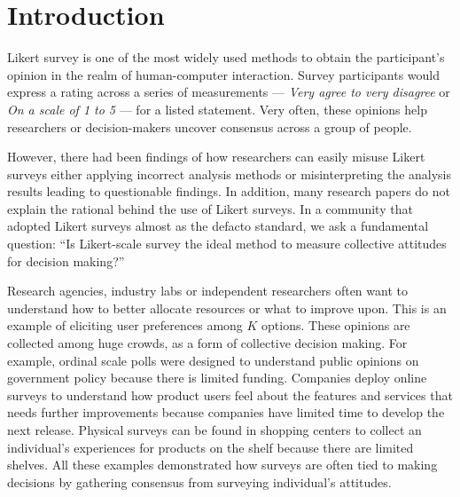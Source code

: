 \section{Introduction}
Likert survey 
is one of the most widely used methods
to obtain the participant's opinion
in the realm of human-computer interaction.
Survey participants would express
a rating across a series of measurements ---
\textit{Very agree to very disagree} or
\textit{On a scale of 1 to 5} ---
for a listed statement.
Very often, 
these opinions help
researchers or decision-makers
uncover consensus 
across a group of people.

However, there had been findings of
how researchers can 
easily misuse Likert surveys
either applying incorrect analysis methods 
\cite{bishop2015use}
or misinterpreting the analysis results
\cite{jamieson2004likert, pell2005use}
leading to questionable findings.
In addition, 
many research papers
do not explain the rational
behind the use of 
Likert surveys.
In a community that adopted Likert surveys
almost as the defacto standard,
we ask a fundamental question: 
``Is Likert-scale survey the ideal method
to measure collective attitudes for decision making?''

Research agencies, industry labs or independent researchers
often want to understand how to better allocate resources
or what to improve upon.
This is an example of eliciting user preferences 
among $K$ options.
These opinions are collected among huge crowds,
as a form of collective decision making.
For example, 
ordinal scale polls were designed
to understand public opinions
on government policy \cite{pew}
because there is limited funding.
Companies deploy online surveys 
to understand how product users 
feel about the features and services
that needs further improvements
because companies have limited time 
to develop the next release.
Physical surveys can be found 
in shopping centers 
to collect an individual's experiences
for products on the shelf
because there are limited shelves.
All these examples demonstrated
how surveys are often tied to 
making decisions 
by gathering consensus
from surveying individual's attitudes.

